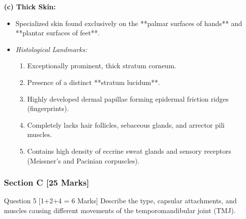\documentclass[11pt,a4paper]{article}
\begin{document}
\begin{ansbox}
\textbf{(c) Thick Skin:}
\begin{itemize}[leftmargin=*]
    \item Specialized skin found exclusively on the **palmar surfaces of hands** and **plantar surfaces of feet**.
    \item \textit{Histological Landmarks:}
    \begin{enumerate}
        \item Exceptionally prominent, thick stratum corneum.
        \item Presence of a distinct **stratum lucidum**.
        \item Highly developed dermal papillae forming epidermal friction ridges (fingerprints).
        \item Completely lacks hair follicles, sebaceous glands, and arrector pili muscles.
        \item Contains high density of eccrine sweat glands and sensory receptors (Meissner's and Pacinian corpuscles).
    \end{enumerate}
\end{itemize}
\end{ansbox}

\subsubsection{Section C [25 Marks]}

\begin{qbox}{Question 5 [1+2+4 = 6 Marks]}
Describe the type, capsular attachments, and muscles causing different movements of the temporomandibular joint (TMJ).
\end{qbox}
\end{document}
